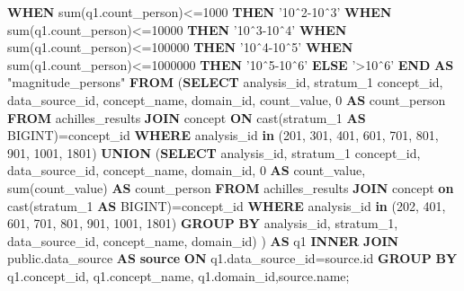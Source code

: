 \documentclass[]{book}
\newenvironment{Shaded}{\begin{snugshade}}{\end{snugshade}}
\newcommand{\KeywordTok}[1]{\textcolor[rgb]{0.13,0.29,0.53}{\textbf{#1}}}
\newcommand{\DecValTok}[1]{\textcolor[rgb]{0.00,0.00,0.81}{#1}}
\newcommand{\StringTok}[1]{\textcolor[rgb]{0.31,0.60,0.02}{#1}}
\newcommand{\OtherTok}[1]{\textcolor[rgb]{0.56,0.35,0.01}{#1}}
\newcommand{\FunctionTok}[1]{\textcolor[rgb]{0.00,0.00,0.00}{#1}}
\newcommand{\NormalTok}[1]{#1}
\begin{document}
\begin{Shaded}
\begin{Highlighting}[]
        \KeywordTok{WHEN} \FunctionTok{sum}\NormalTok{(q1.count_person)<=}\DecValTok{1000} \KeywordTok{THEN} \StringTok{'10ˆ2-10ˆ3'}
        \KeywordTok{WHEN} \FunctionTok{sum}\NormalTok{(q1.count_person)<=}\DecValTok{10000} \KeywordTok{THEN} \StringTok{'10ˆ3-10ˆ4'}
        \KeywordTok{WHEN} \FunctionTok{sum}\NormalTok{(q1.count_person)<=}\DecValTok{100000} \KeywordTok{THEN} \StringTok{'10ˆ4-10ˆ5'}
        \KeywordTok{WHEN} \FunctionTok{sum}\NormalTok{(q1.count_person)<=}\DecValTok{1000000} \KeywordTok{THEN} \StringTok{'10ˆ5-10ˆ6'}
        \KeywordTok{ELSE} \StringTok{'>10ˆ6'}
    \KeywordTok{END} \KeywordTok{AS} \OtherTok{"magnitude_persons"}
\KeywordTok{FROM}\NormalTok{ (}\KeywordTok{SELECT}\NormalTok{ analysis_id,}
\NormalTok{             stratum_1 concept_id,}
\NormalTok{             data_source_id,}
\NormalTok{             concept_name,}
\NormalTok{             domain_id,}
\NormalTok{             count_value, }\DecValTok{0} \KeywordTok{AS}\NormalTok{ count_person}
    \KeywordTok{FROM}\NormalTok{ achilles_results}
    \KeywordTok{JOIN}\NormalTok{ concept }\KeywordTok{ON} \FunctionTok{cast}\NormalTok{(stratum_1 }\KeywordTok{AS}\NormalTok{ BIGINT)=concept_id}
    \KeywordTok{WHERE}\NormalTok{ analysis_id }\KeywordTok{in}\NormalTok{ (}\DecValTok{201}\NormalTok{, }\DecValTok{301}\NormalTok{, }\DecValTok{401}\NormalTok{, }\DecValTok{601}\NormalTok{, }\DecValTok{701}\NormalTok{, }\DecValTok{801}\NormalTok{, }\DecValTok{901}\NormalTok{, }\DecValTok{1001}\NormalTok{, }
        \DecValTok{1801}\NormalTok{)}
    \KeywordTok{UNION}\NormalTok{ (}\KeywordTok{SELECT}\NormalTok{  analysis_id,}
\NormalTok{                   stratum_1 concept_id,}
\NormalTok{                   data_source_id,}
\NormalTok{                   concept_name,}
\NormalTok{                   domain_id,}
                   \DecValTok{0} \KeywordTok{AS}\NormalTok{ count_value,}
                   \FunctionTok{sum}\NormalTok{(count_value) }\KeywordTok{AS}\NormalTok{ count_person}
            \KeywordTok{FROM}\NormalTok{  achilles_results}
            \KeywordTok{JOIN}\NormalTok{ concept }\KeywordTok{on} \FunctionTok{cast}\NormalTok{(stratum_1 }\KeywordTok{AS}\NormalTok{ BIGINT)=concept_id}
            \KeywordTok{WHERE}\NormalTok{ analysis_id }\KeywordTok{in}\NormalTok{ (}\DecValTok{202}\NormalTok{, }\DecValTok{401}\NormalTok{, }\DecValTok{601}\NormalTok{, }\DecValTok{701}\NormalTok{, }\DecValTok{801}\NormalTok{, }\DecValTok{901}\NormalTok{, }
                \DecValTok{1001}\NormalTok{, }\DecValTok{1801}\NormalTok{)}
            \KeywordTok{GROUP} \KeywordTok{BY}\NormalTok{ analysis_id, stratum_1, data_source_id, }
\NormalTok{                concept_name, domain_id) ) }\KeywordTok{AS}\NormalTok{ q1}
    \KeywordTok{INNER} \KeywordTok{JOIN}\NormalTok{ public.data_source }\KeywordTok{AS} \KeywordTok{source} \KeywordTok{ON}\NormalTok{ q1.data_source_id=source.id}
\KeywordTok{GROUP} \KeywordTok{BY}\NormalTok{ q1.concept_id, q1.concept_name, q1.domain_id,source.name;}
\end{Highlighting}
\end{Shaded}
\end{document}
